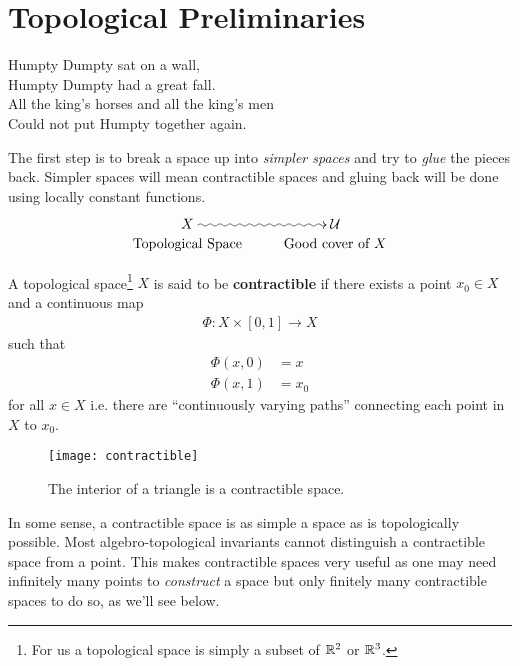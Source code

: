 \section{Topological Preliminaries}
\setlength{\epigraphwidth}{0.41\textwidth}
\epigraph{Humpty Dumpty sat on a wall,\\
	Humpty Dumpty had a great fall.\\
	All the king's horses and all the king's men\\
	Could not put Humpty together again.}{}

The first step is to break a space up into \emph{simpler spaces} and try to \emph{glue} the pieces back. Simpler spaces will mean contractible spaces and gluing back will be done using locally constant functions.
\begin{align*}
 \xymatrix@R-2pc{
 X \ar@{~>}[r] & \U \\
 \mbox{Topological Space} & \mbox{Good cover of } X
 }
\end{align*}
\begin{definition}
	A topological space\footnote{For us a topological space is simply a subset of $ \mathbb{R}^2 $ or $ \mathbb{R}^3$.} $ X$ is said to be \textbf{contractible} if there exists a point $ x_0 \in X$ and a continuous map
	\begin{align*}
		\Phi: X \times [0,1] \rightarrow X
	\end{align*}
	such that
	\begin{align*}
		\Phi(x,0) & = x   \\
		\Phi(x,1) & = x_0
	\end{align*}
	for all $ x \in X$ i.e. there are ``continuously varying paths'' connecting each point in $ X$ to $ x_0$.
\end{definition}

\begin{figure}[H]
	\centering
	\texttt{[image: contractible]}
	\caption{The interior of a triangle is a contractible space.}
\end{figure}

In some sense, a contractible space is as simple a space as is topologically possible. Most algebro-topological invariants cannot distinguish a contractible space from a point. This makes contractible spaces very useful as one may need infinitely many points to \emph{construct} a space but only finitely many contractible spaces to do so, as we'll see below.\\

